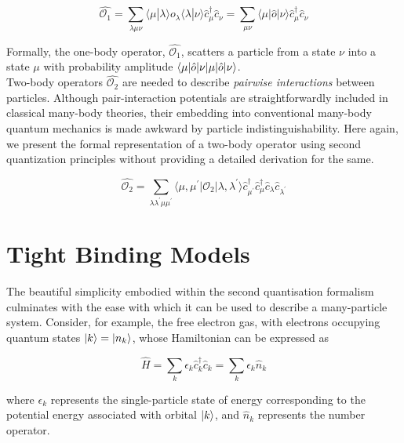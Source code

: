 \begin{equation}
    \hat{\mathcal{O}_{1}} = \sum_{\lambda \mu \nu}\langle \mu | \lambda \rangle o_{\lambda}\langle \lambda | \nu \rangle \hat{c}^{\dagger}_{\mu} \hat{c}_{\nu} = \sum_{\mu \nu}\langle \mu|\hat{o}|\nu \rangle \hat{c}^{\dagger}_{\mu} \hat{c}_{\nu}
\end{equation}

Formally, the one-body operator, $\hat{\mathcal{O}_{1}}$, scatters a particle from a state $\nu$ into a state $\mu$ with probability amplitude $\braket{\mu|\hat{o}|\nu}$. \\

Two-body operators $\hat{\mathcal{O}_{2}}$ are needed to describe \textit{pairwise interactions} between particles. Although pair-interaction potentials are straightforwardly included in classical many-body theories, their embedding into conventional many-body quantum mechanics is made awkward by particle indistinguishability. Here again, we present the formal representation of a two-body operator using second quantization principles without providing a detailed derivation for the same.

\begin{equation}
    \hat{\mathcal{O}_{2}} = \sum_{\lambda \lambda^{\prime} \mu \mu^{\prime}} \langle \mu, \mu^{\prime}|\mathcal{O}_{2}|\lambda, \lambda^{\prime}\rangle \hat{c}_{\mu^{\prime}}^{\dagger} \hat{c}_{\mu}^{\dagger} \hat{c}_{\lambda} \hat{c}_{\lambda^{\prime}}
\end{equation}


\section{Tight Binding Models}

The beautiful simplicity embodied within the second quantisation formalism culminates with the ease with which it can be used to describe a many-particle system. Consider, for example, the free electron gas, with electrons occupying quantum states $\ket{k} = \ket{n_{k}}$, whose Hamiltonian can be expressed as

\begin{equation}
    \hat{H} = \sum_{k}\epsilon_{k}\hat{c}_{k}^{\dagger}\hat{c}_{k} = \sum_{k}\epsilon_{k}\hat{n}_{k}
\end{equation}

where $\epsilon_{k}$ represents the single-particle state of energy corresponding to the potential energy associated with orbital $\ket{k}$, and $\hat{n}_{k}$ represents the number operator. \par

